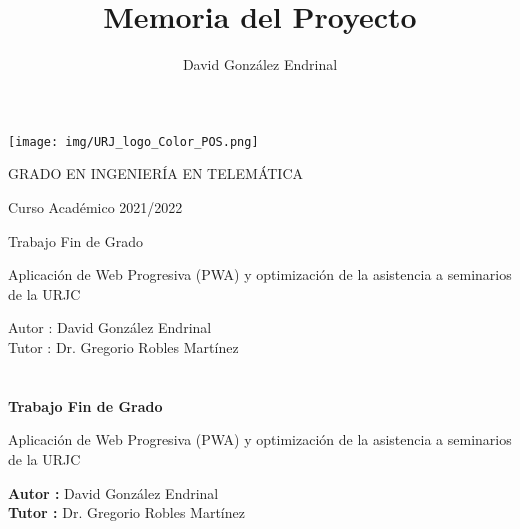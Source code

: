 \documentclass[a4paper, 12pt]{book}
\title{Memoria del Proyecto}
\author{David González Endrinal}
\begin{document}
\renewcommand{\refname}{Bibliografía}  %
\renewcommand{\appendixname}{Apéndice}


\begin{titlepage}
\begin{center}
\texttt{[image: img/URJ\_logo\_Color\_POS.png]}

\vspace{1.75cm}

\Large
GRADO EN INGENIERÍA EN TELEMÁTICA

\vspace{0.4cm}

\large
Curso Académico 2021/2022

\vspace{0.8cm}

Trabajo Fin de Grado

\vspace{2.5cm}

\LARGE
Aplicación de Web Progresiva (PWA) y optimización de la asistencia a seminarios de la URJC

\vspace{4cm}

\large
Autor : David González Endrinal \\
Tutor : Dr. Gregorio Robles Martínez
\end{center}
\end{titlepage}

\newpage
\mbox{}
\thispagestyle{empty} %


\clearpage
{}
\chapter*{}

\vspace{-4cm}
\begin{center}
\LARGE
\textbf{Trabajo Fin de Grado}

\vspace{1cm}
\large
Aplicación de Web Progresiva (PWA) y optimización de la asistencia a seminarios de la URJC

\vspace{1cm}
\large
\textbf{Autor :} David González Endrinal \\
\textbf{Tutor :} Dr. Gregorio Robles Martínez

\end{center}
\end{document}
